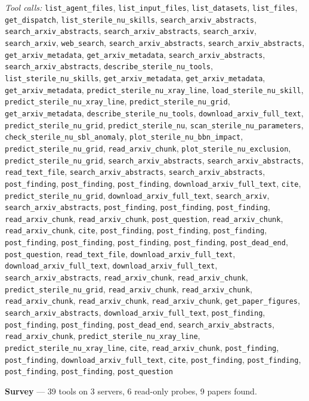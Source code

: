 \documentclass[11pt,a4paper]{article}
\begin{document}
\textit{Tool calls:} \texttt{list\_agent\_files}, \texttt{list\_input\_files}, \texttt{list\_datasets}, \texttt{list\_files}, \texttt{get\_dispatch}, \texttt{list\_sterile\_nu\_skills}, \texttt{search\_arxiv\_abstracts}, \texttt{search\_arxiv\_abstracts}, \texttt{search\_arxiv\_abstracts}, \texttt{search\_arxiv}, \texttt{search\_arxiv}, \texttt{web\_search}, \texttt{search\_arxiv\_abstracts}, \texttt{search\_arxiv\_abstracts}, \texttt{get\_arxiv\_metadata}, \texttt{get\_arxiv\_metadata}, \texttt{search\_arxiv\_abstracts}, \texttt{search\_arxiv\_abstracts}, \texttt{describe\_sterile\_nu\_tools}, \texttt{list\_sterile\_nu\_skills}, \texttt{get\_arxiv\_metadata}, \texttt{get\_arxiv\_metadata}, \texttt{get\_arxiv\_metadata}, \texttt{predict\_sterile\_nu\_xray\_line}, \texttt{load\_sterile\_nu\_skill}, \texttt{predict\_sterile\_nu\_xray\_line}, \texttt{predict\_sterile\_nu\_grid}, \texttt{get\_arxiv\_metadata}, \texttt{describe\_sterile\_nu\_tools}, \texttt{download\_arxiv\_full\_text}, \texttt{predict\_sterile\_nu\_grid}, \texttt{predict\_sterile\_nu}, \texttt{scan\_sterile\_nu\_parameters}, \texttt{check\_sterile\_nu\_sbl\_anomaly}, \texttt{plot\_sterile\_nu\_bbn\_impact}, \texttt{predict\_sterile\_nu\_grid}, \texttt{read\_arxiv\_chunk}, \texttt{plot\_sterile\_nu\_exclusion}, \texttt{predict\_sterile\_nu\_grid}, \texttt{search\_arxiv\_abstracts}, \texttt{search\_arxiv\_abstracts}, \texttt{read\_text\_file}, \texttt{search\_arxiv\_abstracts}, \texttt{search\_arxiv\_abstracts}, \texttt{post\_finding}, \texttt{post\_finding}, \texttt{post\_finding}, \texttt{download\_arxiv\_full\_text}, \texttt{cite}, \texttt{predict\_sterile\_nu\_grid}, \texttt{download\_arxiv\_full\_text}, \texttt{search\_arxiv}, \texttt{search\_arxiv\_abstracts}, \texttt{post\_finding}, \texttt{post\_finding}, \texttt{post\_finding}, \texttt{read\_arxiv\_chunk}, \texttt{read\_arxiv\_chunk}, \texttt{post\_question}, \texttt{read\_arxiv\_chunk}, \texttt{read\_arxiv\_chunk}, \texttt{cite}, \texttt{post\_finding}, \texttt{post\_finding}, \texttt{post\_finding}, \texttt{post\_finding}, \texttt{post\_finding}, \texttt{post\_finding}, \texttt{post\_finding}, \texttt{post\_dead\_end}, \texttt{post\_question}, \texttt{read\_text\_file}, \texttt{download\_arxiv\_full\_text}, \texttt{download\_arxiv\_full\_text}, \texttt{download\_arxiv\_full\_text}, \texttt{search\_arxiv\_abstracts}, \texttt{read\_arxiv\_chunk}, \texttt{read\_arxiv\_chunk}, \texttt{predict\_sterile\_nu\_grid}, \texttt{read\_arxiv\_chunk}, \texttt{read\_arxiv\_chunk}, \texttt{read\_arxiv\_chunk}, \texttt{read\_arxiv\_chunk}, \texttt{read\_arxiv\_chunk}, \texttt{get\_paper\_figures}, \texttt{search\_arxiv\_abstracts}, \texttt{download\_arxiv\_full\_text}, \texttt{post\_finding}, \texttt{post\_finding}, \texttt{post\_finding}, \texttt{post\_dead\_end}, \texttt{search\_arxiv\_abstracts}, \texttt{read\_arxiv\_chunk}, \texttt{predict\_sterile\_nu\_xray\_line}, \texttt{predict\_sterile\_nu\_xray\_line}, \texttt{cite}, \texttt{read\_arxiv\_chunk}, \texttt{post\_finding}, \texttt{post\_finding}, \texttt{download\_arxiv\_full\_text}, \texttt{cite}, \texttt{post\_finding}, \texttt{post\_finding}, \texttt{post\_finding}, \texttt{post\_finding}, \texttt{post\_question}\par
\textbf{Survey} --- 39 tools on 3 servers, 6 read-only probes, 9 papers found.
\end{document}
